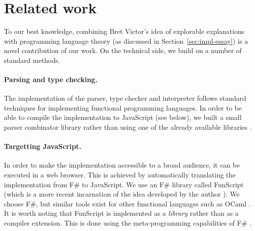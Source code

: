 \section{Related work}
\label{sec:impl-related}

To our best knowledge, combining Bret Victor's idea of explorable explanations with programming
language theory (as discussed in Section~\ref{sec:impl-essay}) is a novel contribution of our work.
On the technical side, we build on a number of standard methods.

\paragraph{Parsing and type checking.} The implementation of the parser, type checker and
interpreter follows standard techniques for implementing functional programming languages.
In order to be able to compile the implementation to JavaScript (see below), we built a
small parser combinator library \cite{monad-parsing} rather than using one of the already
available libraries \cite{other-fparsec}.

\paragraph{Targetting JavaScript.} In order to make the implementation accessible to a broad
audience, it can be executed in a web browser. This is achieved by automatically translating the
implementation from F\# to JavaScript. We use an F\# library called FunScript \cite{other-funscript}
(which is a more recent incarnation of the idea developed by the author \cite{app-fsharp-webtools}).
We choose F\#, but similar tools exist for other functional languages such as OCaml \cite{app-ocaml-js}.
It is worth noting that FunScript is implemented as a \emph{library} rather than as a compiler
extension. This is done using the meta-programming capabilities of F\# \cite{app-fsharp-metaprog}.


